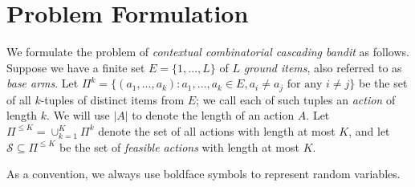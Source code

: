 \documentclass{article}
\newcommand{\EE}{\mathbb{E}}
\newcommand{\RR}{\mathbb{R}}
\newcommand{\bA}{\mathbf{A}}
\newcommand{\br}{\mathbf{r}}
\newcommand{\bw}{\mathbf{w}}
\newcommand{\cS}{\mathcal{S}}
\newcommand{\argmax}{\mathrm{argmax}}
\newcommand{\abs}[1]{\left| #1 \right|}
\begin{document}

\section{Problem Formulation}

We formulate the problem of {\em contextual combinatorial cascading bandit} as follows. Suppose we have a finite set  $E=\{1,...,L\}$ of $L$ \textit{ground items}, also referred to as {\em base arms}. Let $\Pi^k=\{(a_1,...,a_k): a_1,...,a_k \in E, a_i \neq a_j \text{ for any } i \neq j\}$ be the set of all $k$-tuples of distinct items from $E$; we call each of such tuples an {\em action} of length $k$. We will use $|A|$ to denote the length of an action $A$. Let $\Pi^{\leq K}= \cup_{k=1}^K \Pi^{k}$ denote the set of all actions with length at most $K$, and let $\cS \subseteq \Pi^{\leq K}$ be the set of \textit{feasible actions} with length at most $K$. 

As a convention, we always use boldface symbols to represent random variables.
\end{document}
